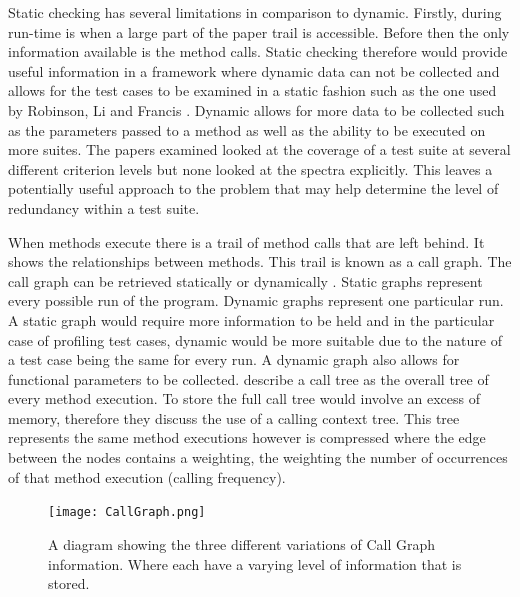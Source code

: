 Static checking has several limitations in comparison to dynamic. Firstly, during run-time is when a large part of the paper trail is accessible. Before then the only information available is the method calls.  Static checking therefore would provide useful information in a framework where dynamic data can not be collected and allows for the test cases to be examined in a static fashion such as the one used by Robinson, Li and Francis \cite{li2008static}. Dynamic allows for more data to be collected such as the parameters passed to a method as well as the ability to be executed on more suites. The papers examined looked at the coverage of a test suite at several different criterion levels but none looked at the spectra explicitly. This leaves a potentially useful approach to the problem that may help determine the level of redundancy within a test suite. 

When methods execute there is a trail of method calls that are left behind. It shows the relationships between methods. This trail is known as a call graph. The call graph can be retrieved statically or dynamically \cite{graham1982gprof}. Static graphs represent every possible run of the program. Dynamic graphs represent one particular run. A static graph would require more information to be held and in the particular case of profiling test cases, dynamic would be more suitable due to the nature of a test case being the same for every run. A dynamic graph also allows for functional parameters to be collected. \cite{Zhuang06accurate} describe a call tree as the overall tree of every method execution. To store the full call tree would involve an excess of memory, therefore they discuss the use of a calling context tree. This tree represents the same method executions however is compressed where the edge between the nodes contains a weighting, the weighting the number of occurrences of that method execution (calling frequency).

\begin{figure}[h]
\begin{center}
\texttt{[image: CallGraph.png]}
\end{center}
\caption{A diagram showing the three different variations of Call Graph information. Where  each have a varying level of information that is stored.}
\label{fig:venndiagram}
\end{figure}


